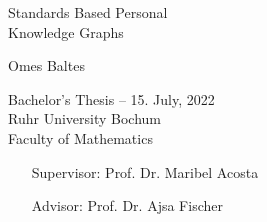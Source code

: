 \begin{titlepage}
    \begin{center}
        \vspace*{1cm}
        \Huge
        Standards Based Personal\\ Knowledge Graphs \\
        
        \vspace*{1cm}
        
        \Large
        Omes Baltes
      
        \vfill

        \large
        Bachelor's Thesis -- 15. July, 2022\\
        Ruhr University Bochum\\
        Faculty of Mathematics\\
        \vspace{1cm}

        \begin{itemize}[noitemsep, leftmargin=13em]
            \item[Supervisor:] Prof. Dr. Maribel Acosta 
            \item[Advisor:] Prof. Dr. Ajsa Fischer
        \end{itemize}
        
        
    \end{center}
\end{titlepage}